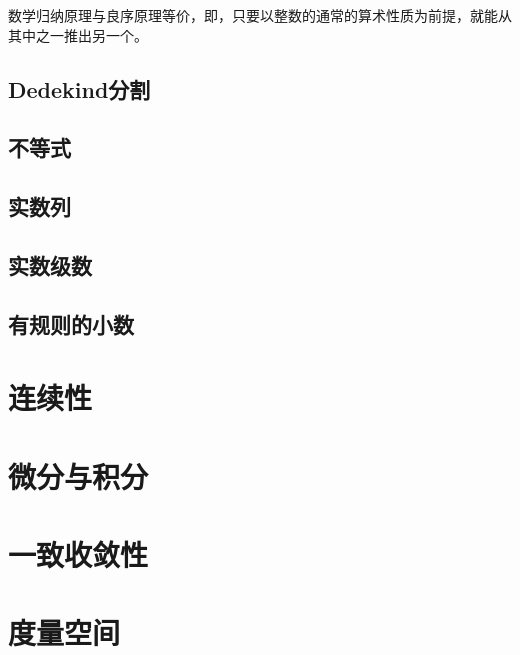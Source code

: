 \begin{proposition}{}{}
数学归纳原理与良序原理等价，即，只要以整数的通常的算术性质为前提，就能从其中之一推出另一个。
\end{proposition}

\section{Dedekind分割}\label{sec0100102}


\section{不等式}\label{sec0100103}

\section{实数列}\label{sec0100104}

\section{实数级数}\label{sec0100105}

\section{有规则的小数}\label{sec0100106}


\chapter{连续性}\label{ch01002}


\chapter{微分与积分}\label{ch01003}

\chapter{一致收敛性}\label{ch01004}

\chapter{度量空间}\label{ch01005}












